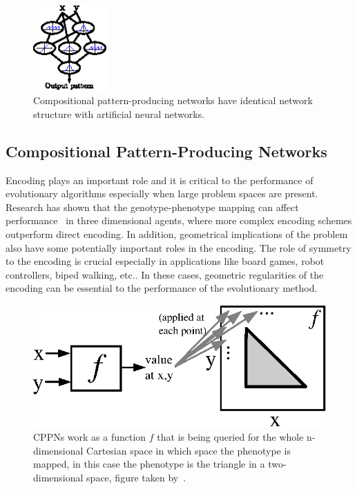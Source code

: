 \begin{figure}[t!]
\centering
\includegraphics[width=0.25\textwidth]{../Figures/Misc/cppnNetwork.eps}
\caption{Compositional pattern-producing networks have identical network structure with artificial neural networks.}
\label{fig:cppnNetwork}
\end{figure}



\subsection{Compositional Pattern-Producing Networks}
\label{CPPN}

Encoding plays an important role and it is critical to the performance of evolutionary algorithms especially when large problem spaces are present. Research has shown that the genotype-phenotype mapping can affect performance~\citep{komosinski2001comparison} in three dimensional agents, where more complex encoding schemes outperform direct encoding. In addition, geometrical implications of the problem also have some potentially important roles in the encoding. The role of symmetry to the encoding is crucial especially in applications like board games, robot controllers, biped walking, etc.. In these cases, geometric regularities of the encoding can be essential to the performance of the evolutionary method.

\begin{figure}[t!]
\centering
\includegraphics{../Figures/Misc/cppnResolution.eps}
\caption{CPPNs work as a function $f$ that is being queried for the whole n-dimensional Cartesian space in which space the phenotype is mapped, in this case the phenotype is the triangle in a two-dimensional space, figure taken by~\citep{stanley2007compositional}.}
\label{fig:cppnResolution}
\end{figure}


